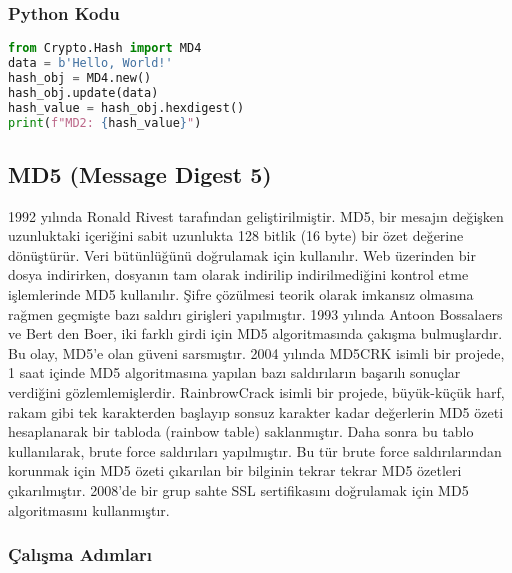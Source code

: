 \subsubsection{Python Kodu}

\begin{lstlisting}[language=Python]
from Crypto.Hash import MD4
data = b'Hello, World!'
hash_obj = MD4.new()
hash_obj.update(data)
hash_value = hash_obj.hexdigest()
print(f"MD2: {hash_value}")
\end{lstlisting}

\newpage

\subsection{MD5 (Message Digest 5)}

1992 yılında Ronald Rivest tarafından geliştirilmiştir. MD5, bir mesajın değişken uzunluktaki içeriğini sabit uzunlukta 128 bitlik (16 byte) bir özet değerine dönüştürür. Veri bütünlüğünü doğrulamak için kullanılır. Web üzerinden bir dosya indirirken, dosyanın tam olarak indirilip indirilmediğini kontrol etme işlemlerinde MD5 kullanılır. Şifre çözülmesi teorik olarak imkansız olmasına rağmen geçmişte bazı saldırı girişleri yapılmıştır. 1993 yılında Antoon Bossalaers ve Bert den Boer, iki farklı girdi için MD5 algoritmasında çakışma bulmuşlardır. Bu olay, MD5'e olan güveni sarsmıştır. 2004 yılında MD5CRK isimli bir projede, 1 saat içinde MD5 algoritmasına yapılan bazı saldırıların başarılı sonuçlar verdiğini gözlemlemişlerdir. RainbrowCrack isimli bir projede, büyük-küçük harf, rakam gibi tek karakterden başlayıp sonsuz karakter kadar değerlerin MD5 özeti hesaplanarak bir tabloda (rainbow table) saklanmıştır. Daha sonra bu tablo kullanılarak, brute force saldırıları yapılmıştır. Bu tür brute force saldırılarından korunmak için MD5 özeti çıkarılan bir bilginin tekrar tekrar MD5 özetleri çıkarılmıştır. 2008'de bir grup sahte SSL sertifikasını doğrulamak için MD5 algoritmasını kullanmıştır. 

\subsubsection{Çalışma Adımları}

